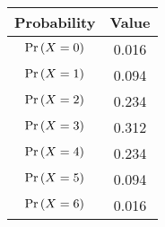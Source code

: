  {
	\begin{tabular}{|c|c|}
		\hline
		\textbf{Probability}&\textbf{Value}\\
		\hline
		$\Pr\left(X=0\right)$ &0.016 \\
		\hline
	$\Pr\left(X=1\right)$ &0.094 \\
		\hline
	$\Pr\left(X=2\right)$ &0.234 \\
		\hline
	$\Pr\left(X=3\right)$ &0.312 \\
		\hline
	$\Pr\left(X=4\right)$ &0.234 \\
	       \hline
	$\Pr\left(X=5\right)$ &0.094 \\
	       \hline
	$\Pr\left(X=6\right)$ &0.016 \\
	       \hline
	\end{tabular}
}
